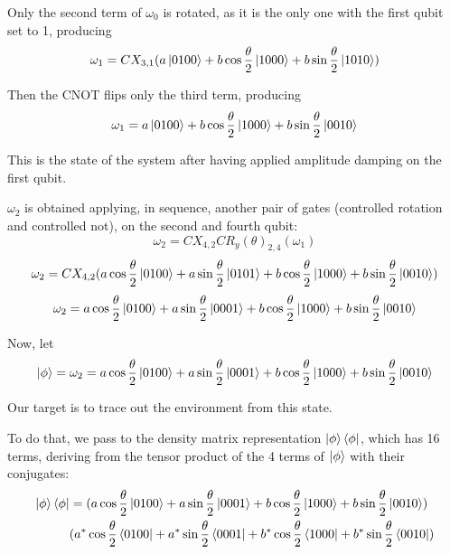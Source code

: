 \documentclass{masterthesis}
\begin{document}
Only the second term of $\omega_0$ is rotated, as it is the only one with the first qubit set to 1, producing
\begin{equation}
    \omega_1 = CX_{3,1} (a\ket{0100} + b\cos\frac{\theta}{2}\ket{1000} + b\sin\frac{\theta}{2}\ket{1010})
\end{equation}

Then the CNOT flips only the third term, producing
\begin{equation}
    \omega_1 = a\ket{0100} + b\cos\frac{\theta}{2}\ket{1000} + b\sin\frac{\theta}{2}\ket{0010}
\end{equation}

This is the state of the system after having applied amplitude damping on the first qubit.

$\omega_2$ is obtained applying, in sequence, another pair of gates (controlled rotation and controlled not), on the second and fourth qubit:
\begin{equation}
    \omega_2 = CX_{4,2} CR_{y}(\theta)_{2,4} (\omega_1)
\end{equation}
\begin{equation}
    \omega_2 = CX_{4,2} (a\cos\frac{\theta}{2}\ket{0100} + a\sin\frac{\theta}{2}\ket{0101} + b\cos\frac{\theta}{2}\ket{1000} + b\sin\frac{\theta}{2}\ket{0010})
\end{equation}
\begin{equation}
    \omega_2 = a\cos\frac{\theta}{2}\ket{0100} + a\sin\frac{\theta}{2}\ket{0001} + b\cos\frac{\theta}{2}\ket{1000} + b\sin\frac{\theta}{2}\ket{0010}
\end{equation}

Now, let
\begin{equation}
    \ket{\phi} = \omega_2 = a\cos\frac{\theta}{2}\ket{0100} + a\sin\frac{\theta}{2}\ket{0001} + b\cos\frac{\theta}{2}\ket{1000} + b\sin\frac{\theta}{2}\ket{0010}
\end{equation}

Our target is to trace out the environment from this state.

To do that, we pass to the density matrix representation $\ket{\phi}\bra{\phi}$, which has 16 terms, deriving from the tensor product of the 4 terms of $\ket{\phi}$ with their conjugates:
\begin{align}
    \ket{\phi}\bra{\phi} &= (a\cos\frac{\theta}{2}\ket{0100} + a\sin\frac{\theta}{2}\ket{0001} + b\cos\frac{\theta}{2}\ket{1000} + b\sin\frac{\theta}{2}\ket{0010}) \nonumber \\
    &(a^{*}\cos\frac{\theta}{2}\bra{0100} + a^{*}\sin\frac{\theta}{2}\bra{0001} + b^{*}\cos\frac{\theta}{2}\bra{1000} + b^{*}\sin\frac{\theta}{2}\bra{0010})
\end{align}
\end{document}
